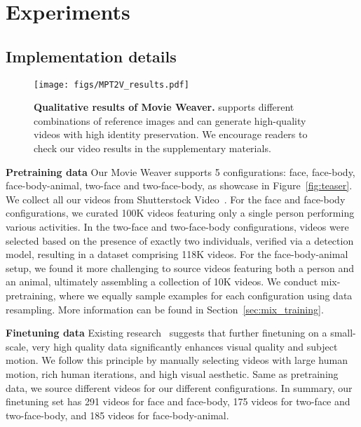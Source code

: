 \section{Experiments}
\label{sec:experiments}

\subsection{Implementation details}

\begin{figure*}[t]
    \centering
    \vspace{-1em}
    \texttt{[image: figs/MPT2V\_results.pdf]}
    \vspace{-0.5em}
    \caption{\textbf{Qualitative results of Movie Weaver.} \workname supports different combinations of reference images and can generate high-quality videos with high identity preservation. We encourage readers to check our video results in the supplementary materials.}
    \label{fig:mpt2v_results}
    \vspace{-0.5em}
\end{figure*}


\textbf{Pretraining data} Our Movie Weaver supports 5 configurations: face, face-body, face-body-animal, two-face and two-face-body, as showcase in Figure~\ref{fig:teaser}.
We collect all our videos from Shutterstock Video~\cite{ShutterstockVideo}.
For the face and face-body configurations, we curated 100K videos featuring only a single person performing various activities.
In the two-face and two-face-body configurations, videos were selected based on the presence of exactly two individuals, verified via a detection model, resulting in a dataset comprising 118K videos. 
For the face-body-animal setup, we found it more challenging to source videos featuring both a person and an animal, ultimately assembling a collection of 10K videos.
We conduct mix-pretraining, where we equally sample examples for each configuration using data resampling. More information can be found in Section~\ref{sec:mix_training}.

\textbf{Finetuning data} Existing research~\cite{dai2023emu,he2024imagine,moviegen} suggests that further finetuning on a small-scale, very high quality data significantly enhances visual quality and subject motion. 
We follow this principle by manually selecting videos with large human motion, rich human iterations, and high visual aesthetic. 
Same as pretraining data, we source different videos for our different configurations.
In summary, our finetuning set has 291 videos for face and face-body, 175 videos for two-face and two-face-body, and 185 videos for face-body-animal.


